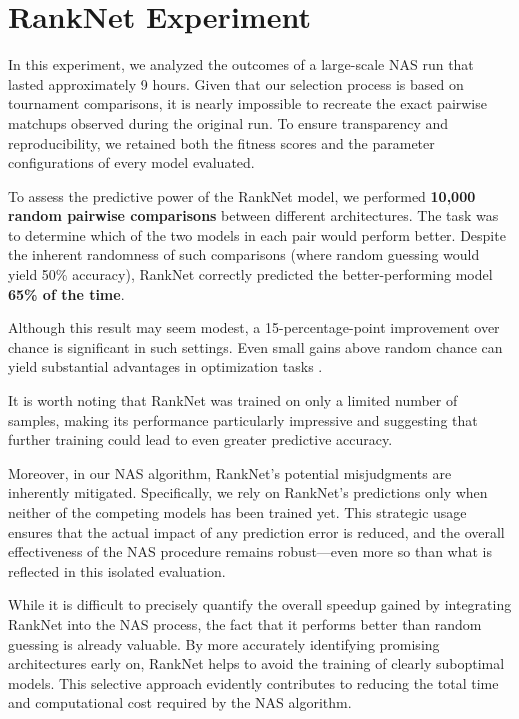 \section{RankNet Experiment}
\label{sec:ranknet_experiment}
In this experiment, we analyzed the outcomes of a large-scale NAS run that lasted approximately 9 hours. Given that our selection process is based on tournament comparisons, it is nearly impossible to recreate the exact pairwise matchups observed during the original run. To ensure transparency and reproducibility, we retained both the fitness scores and the parameter configurations of every model evaluated.

To assess the predictive power of the RankNet model, we performed \textbf{10,000 random pairwise comparisons} between different architectures. The task was to determine which of the two models in each pair would perform better. Despite the inherent randomness of such comparisons (where random guessing would yield 50\% accuracy), RankNet correctly predicted the better-performing model \textbf{65\% of the time}.

Although this result may seem modest, a 15-percentage-point improvement over chance is significant in such settings. Even small gains above random chance can yield substantial advantages in optimization tasks \cite{freund1999large}.

It is worth noting that RankNet was trained on only a limited number of samples, making its performance particularly impressive and suggesting that further training could lead to even greater predictive accuracy.

Moreover, in our NAS algorithm, RankNet's potential misjudgments are inherently mitigated. Specifically, we rely on RankNet's predictions only when neither of the competing models has been trained yet. This strategic usage ensures that the actual impact of any prediction error is reduced, and the overall effectiveness of the NAS procedure remains robust—even more so than what is reflected in this isolated evaluation.

While it is difficult to precisely quantify the overall speedup gained by integrating RankNet into the NAS process, the fact that it performs better than random guessing is already valuable. By more accurately identifying promising architectures early on, RankNet helps to avoid the training of clearly suboptimal models. This selective approach evidently contributes to reducing the total time and computational cost required by the NAS algorithm.


